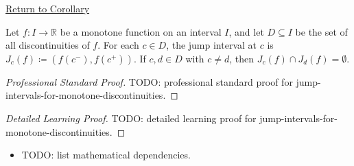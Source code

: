 \newpage
{}
\label{prf:jump-intervals-for-monotone-discontinuities}

\begin{remark*}[Return]
\hyperref[cor:jump-intervals-for-monotone-discontinuities]{Return to Corollary}
\end{remark*}

\begin{corollary*}
Let $f : I \to \mathbb{R}$ be a monotone function on an interval $I$, and let $D \subseteq I$ be the set of all discontinuities of $f$. For each $c \in D$, the jump interval at $c$ is $J_c(f) \coloneqq (f(c^{-}), f(c^{+}))$. If $c, d \in D$ with $c \neq d$, then $J_c(f) \cap J_d(f) = \emptyset$.
\end{corollary*}

\begin{proof}[Professional Standard Proof]
\LRAProofBodyStart
TODO: professional standard proof for jump-intervals-for-monotone-discontinuities.
\end{proof}

\begin{proof}[Detailed Learning Proof]
\LRAProofBodyStart
TODO: detailed learning proof for jump-intervals-for-monotone-discontinuities.
\end{proof}

\begin{remark*}
\end{remark*}

\begin{dependencies}
\begin{itemize}
  \item TODO: list mathematical dependencies.
\end{itemize}
\end{dependencies}

\clearpage
